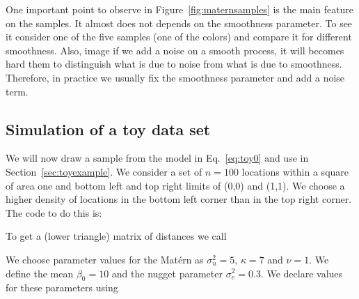 One important point to observe 
in Figure~\ref{fig:maternsamples} 
is the main feature on the samples. 
It almost does not depends on the smoothness parameter. 
To see it consider one of the five samples 
(one of the colors) and compare it for 
different smoothness. 
Also, image if we add a noise on a smooth process, 
it will becomes hard them to distinguish what is 
due to noise from what is due to smoothness. 
Therefore, in practice we usually fix the 
smoothness parameter and add a noise term. 

\subsection{Simulation of a toy data set}\label{sec:simulatoy} 

We will now draw a sample from the model in Eq.~\ref{eq:toy0} 
and use in Section~\ref{sec:toyexample}. 
We consider a set of $n=100$ locations 
within a square of area one and bottom left and 
top right limits of (0,0) and (1,1). 
We choose a higher density of locations in 
the bottom left corner than in the top right corner. 
The  code to do this is:
\begin{knitrout}
\color{fgcolor}\begin{kframe}
\begin{alltt}
 \hlkwb{<-} \hlstd{;}  \hlstd{(}\hlstd{)}
 \hlkwb{<-} \hlstd{(}\hlstd{=}\hlstd{(}\hlopt{:}\hlopt{/}\hlopt{-}\hlopt{/}\hlopt{^}\hlstd{,} \hlstd{=}\hlstd{(}\hlopt{:}\hlopt{/}\hlopt{-}\hlopt{/}\hlopt{^}\hlstd{)}
\end{alltt}
\end{kframe}
\end{knitrout}
To get a (lower triangle) matrix of distances we call
\begin{knitrout}
\color{fgcolor}\begin{kframe}
\begin{alltt}
 \hlkwb{<-} 
\end{alltt}
\end{kframe}
\end{knitrout}

We choose parameter values for the Mat\'ern as 
$\sigma^2_u=5$, $\kappa=7$ and $\nu=1$. 
We define the mean $\beta_0=10$  and 
the nugget parameter $\sigma^2_e=0.3$. 
We declare values for these parameters using
\begin{knitrout}
\color{fgcolor}\begin{kframe}
\begin{alltt}
 \hlkwb{<-}  \hlkwb{<-}  \hlkwb{<-}  \hlkwb{<-}  \hlkwb{<-} 
\end{alltt}
\end{kframe}
\end{knitrout}

